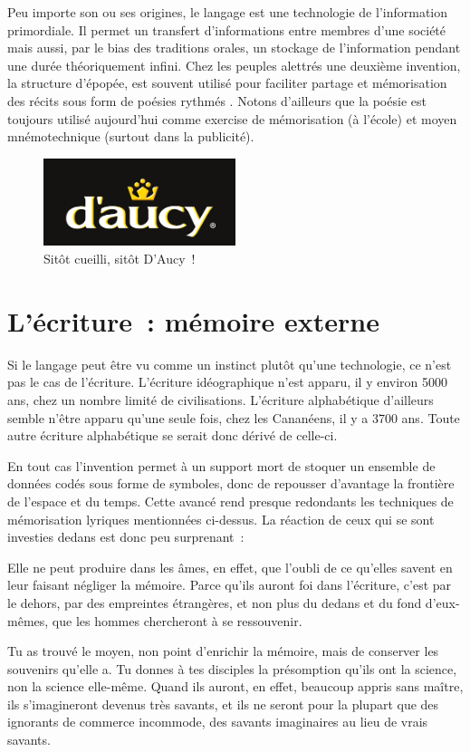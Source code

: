 Peu importe son ou ses origines, le langage est une technologie de l'information primordiale. Il permet un transfert d'informations entre membres d'une société mais aussi, par le bias des traditions orales, un stockage de l'information pendant une durée théoriquement infini. Chez les peuples alettrés une deuxième invention, la structure d'épopée, est souvent utilisé pour faciliter partage et mémorisation des récits sous form de poésies rythmés \cite{havelock-preface-plato}. Notons d'ailleurs que la poésie est toujours utilisé aujourd'hui comme exercise de mémorisation (à l'école) et moyen mnémotechnique (surtout dans la publicité).

\begin{figure}[H]
\centering
\includegraphics[width=0.5\textwidth]{../resources/illustrations/daucy}
\caption{\og{}Sitôt cueilli, sitôt D'Aucy~!\fg{}}
\end{figure}


\chapter{L'écriture~: mémoire externe}
Si le langage peut être vu comme un instinct plutôt qu'une technologie, ce n'est pas le cas de l'écriture. L'écriture idéographique n'est apparu, il y environ 5000 ans, chez un nombre limité de civilisations. L'écriture alphabétique d'ailleurs semble n'être apparu qu'une seule fois, chez les Cananéens, il y a 3700 ans\cite{linguistics-pinker}. Toute autre écriture alphabétique se serait donc dérivé de celle-ci.

En tout cas l'invention permet à un support mort de stoquer un ensemble de données codés sous forme de symboles, donc de repousser d'avantage la frontière de l'espace et du temps. Cette avancé rend presque redondants les techniques de mémorisation lyriques mentionnées ci-dessus. La réaction de ceux qui se sont investies dedans est donc peu surprenant~:


\begin{coolquote}
Elle ne peut produire dans les âmes, en effet, que l’oubli de ce qu’elles  savent en leur faisant négliger la mémoire. Parce qu’ils auront foi dans  l’écriture, c’est par le dehors, par des empreintes étrangères, et non plus du dedans et du fond d’eux-mêmes, que les hommes chercheront à se ressouvenir. 

Tu as trouvé le moyen, non point d’enrichir la mémoire, mais de conserver les souvenirs qu’elle a. Tu donnes à tes disciples la présomption qu’ils ont la science, non la science elle-même. Quand ils auront, en effet, beaucoup appris sans maître, ils s’imagineront devenus très savants, et ils ne seront pour la plupart que des ignorants de commerce incommode, des savants imaginaires au lieu de vrais savants.
\end{coolquote}


